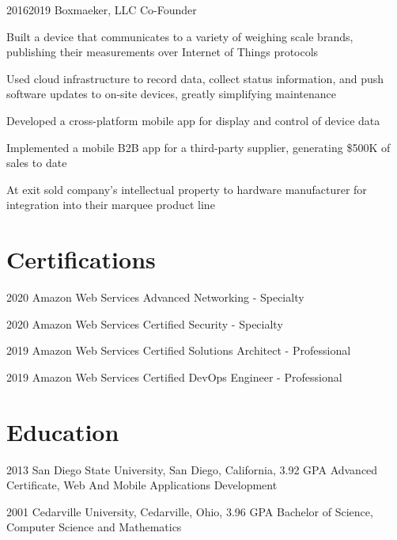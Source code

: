 \documentclass{article}
\begin{document}
\job
  {2016}{2019}
  {Boxmaeker, LLC}
  {Co-Founder}
  {\begin{achievements}
    \item Built a device that communicates to a variety of weighing scale brands, publishing their measurements over Internet of Things protocols
    \item Used cloud infrastructure to record data, collect status information, and push software updates to on-site devices, greatly simplifying maintenance
    \item Developed a cross-platform mobile app for display and control of device data
    \item Implemented a mobile B2B app for a third-party supplier, generating \$500K of sales to date
    \item At exit sold company's intellectual property to hardware manufacturer for integration into their marquee product line
  \end{achievements}}


\section{Certifications}

\education
  {2020}
  {Amazon Web Services}
  {Advanced Networking - Specialty}

\education
  {2020}
  {Amazon Web Services}
  {Certified Security - Specialty}

\education
  {2019}
  {Amazon Web Services}
  {Certified Solutions Architect - Professional}

\education
  {2019}
  {Amazon Web Services}
  {Certified DevOps Engineer - Professional}


\section{Education}

\education
  {2013}
  {San Diego State University, San Diego, California, 3.92 GPA}
  {Advanced Certificate, Web And Mobile Applications Development}

\education
  {2001}
  {Cedarville University, Cedarville, Ohio, 3.96 GPA}
  {Bachelor of Science, Computer Science and Mathematics}


\section{}

\credits
\end{document}
